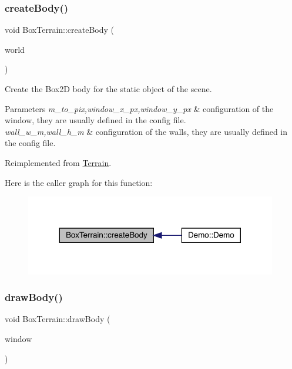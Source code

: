 \subsubsection{\texorpdfstring{create\+Body()}{createBody()}}
{\footnotesize\ttfamily void Box\+Terrain\+::create\+Body (\begin{DoxyParamCaption}\item[{b2\+World $\ast$}]{world }\end{DoxyParamCaption})\hspace{0.3cm}{\ttfamily [virtual]}}

Create the Box2D body for the static object of the scene. 
\begin{DoxyParams}{Parameters}
{\em m\+\_\+to\+\_\+pix,window\+\_\+x\+\_\+px,window\+\_\+y\+\_\+px} & configuration of the window, they are usually defined in the config file. \\
\hline
{\em wall\+\_\+w\+\_\+m,wall\+\_\+h\+\_\+m} & configuration of the walls, they are usually defined in the config file. \\
\hline
\end{DoxyParams}


Reimplemented from \mbox{\hyperlink{class_terrain_a97e007277f8abb9dde20ef2b49c38a3a}{Terrain}}.

Here is the caller graph for this function\+:\nopagebreak
\begin{figure}[H]
\begin{center}
\leavevmode
\includegraphics[width=311pt]{class_box_terrain_a7f5172beaa4e5dcb4d45f3c5e46e3155_icgraph}
\end{center}
\end{figure}
\mbox{\label{class_box_terrain_a309e67722a008ef166198d36add1690a}} 
\subsubsection{\texorpdfstring{draw\+Body()}{drawBody()}}
{\footnotesize\ttfamily void Box\+Terrain\+::draw\+Body (\begin{DoxyParamCaption}\item[{sf\+::\+Render\+Window \&}]{window }\end{DoxyParamCaption})\hspace{0.3cm}{\ttfamily [virtual]}}

